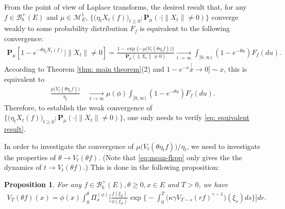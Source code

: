 \documentclass[12pt,a4paper]{amsart}
\newtheorem{prop}[thm]{Proposition}
\theoremstyle{definition}
\numberwithin{equation}{section}
\begin{document}
From the point of view of Laplace transforms, the desired result that, for any $f\in \mathscr B^+_b(E)$ and $\mu\in \mathcal M_E^1$, $\big\{\big(\eta_t X_t(f)\big)_{t \geq 0}; \mathbf P_{\mu}(\cdot | \|X_t\| \neq 0)\big\}$ converge weakly to some probability distribution $F_f$ is equivalent to the following convergence:
\begin{align}
	\mathbf P_\mu[1- e^{-\theta \eta_t X_t(f)} | \|X_t\|\neq 0]
	= \frac{1- \exp\{- \mu\big(V_t(\theta \eta_t f)\big) \}}{\mathbf P_\mu(\|X_t\|\neq 0)}
	\xrightarrow[t\to \infty]{} \int_{[0,\infty)}(1-e^{-\theta u}) F_f(du).
\end{align}
According to Theorem \ref{thm: main theorem}(2) and $1-e^{-x} \stackrel[x\to 0]{}{\sim} x$, this is equivalent to
\begin{align}\label{eq: equivalent result}
	\frac{\mu\big( V_t(\theta \eta_t f) \big)}{ \eta_t}
	\quad \xrightarrow[t\to \infty]{} \mu(\phi) \int_{[0,\infty)}(1-e^{-\theta u})F_{f}(du).
\end{align}
Therefore, to establish the weak convergence of $\big\{\big(\eta_t X_t(f)\big)_{t \geq 0}; \mathbf P_{\mu}(\cdot | \|X_t\|\neq 0)\big\}$, one only needs to verify \eqref{eq: equivalent result}.
	
In order to investigate the convergence of $\mu\big( V_t(\theta \eta_t f) \big)/ \eta_t$, we need to investigate the properties of $\theta\to V_t(\theta f)$.
(Note that \eqref{eq:mean-fkpp} only gives the the dynamics of $t\to V_t(\theta f)$.)
This is done in the following proposition:

\begin{prop}
	For any $f\in \mathscr B^+_b(E),\theta \geq 0,x\in E$ and $T>0$, we have
\begin{align}\label{eq: equation for Vt(theta f) for theta}
	V_T ( \theta f) ( x)
	= \phi( x) \int_0^\theta \Pi_x^{(\phi)} \Big[ \frac{ f(\xi_T) } { \phi(\xi_T) } \exp\Big\{ - \int_0^T \big( \kappa \gamma V_{T-s} (r f)^{ \gamma - 1} \big) ( \xi_s) ds\Big\} \Big] dr.
\end{align}
\end{prop}
\end{document}
